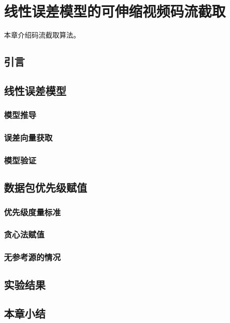 \chapter{线性误差模型的可伸缩视频码流截取}
本章介绍码流截取算法。

\section{引言}

\section{线性误差模型}

\subsection{模型推导}

\subsection{误差向量获取}

\subsection{模型验证}

\section{数据包优先级赋值}

\subsection{优先级度量标准}

\subsection{贪心法赋值}

\subsection{无参考源的情况}

\section{实验结果}

\section{本章小结}